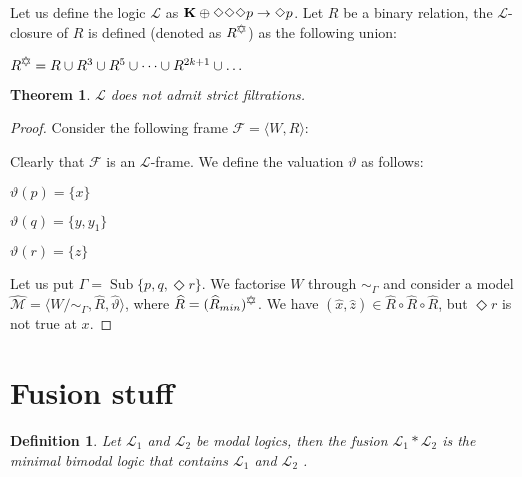 \documentclass[a4paper]{article}
\theoremstyle{defin}
\newtheorem{defin}{Definition}
\theoremstyle{theorem}
\newtheorem{theorem}{Theorem}
\theoremstyle{prop}
\theoremstyle{lemma}
\theoremstyle{fact}
\theoremstyle{ex}
\theoremstyle{col}
\theoremstyle{claim}
\begin{document}
Let us define the logic $\mathcal{L}$ as ${\bf K} \oplus \Diamond \Diamond \Diamond p \to \Diamond p$. Let $R$ be a binary relation, the $\mathcal{L}$-closure of $R$ is defined (denoted as $R^{\davidsstar}$) as the following union:
\begin{center}
  $R^{\davidsstar} = R \cup R^3 \cup R^5 \cup \dots \cup R^{2k+1} \cup \dots$
\end{center}

\begin{theorem}
  $\mathcal{L}$ does not admit strict filtrations.
\end{theorem}

\begin{proof}
  Consider the following frame $\mathcal{F} = \langle W, R \rangle$:

\vspace{\baselineskip}


\vspace{\baselineskip}

  Clearly that $\mathcal{F}$ is an $\mathcal{L}$-frame. We define the valuation $\vartheta$ as follows:

  \begin{center}
    $\vartheta(p) = \{ x \}$

    $\vartheta(q) = \{ y, y_1 \}$

    $\vartheta(r) = \{ z \}$
  \end{center}
  Let us put $\Gamma = \operatorname{Sub} \{ p, q, \Diamond r \}$. We factorise $W$ through $\sim_{\Gamma}$ and consider a model $\widehat{\mathcal{M}} = \langle W / \sim_{\Gamma}, \widehat{R}, \widehat{\vartheta} \rangle$, where $\widehat{R} = (\widehat{R}_{min})^{\davidsstar}$.
  We have $(\hat{x}, \hat{z}) \in \widehat{R} \circ \widehat{R} \circ \widehat{R}$, but $\Diamond r$ is not true at $x$.
\end{proof}

\section{Fusion stuff}

\begin{defin}
  Let $\mathcal{L}_1$ and $\mathcal{L}_2$ be modal logics, then the fusion $\mathcal{L}_1 * \mathcal{L}_2$ is the minimal bimodal logic that contains $\mathcal{L}_1$ and $\mathcal{L}_2$ \cite{kurucz200715}.
\end{defin}
\end{document}
